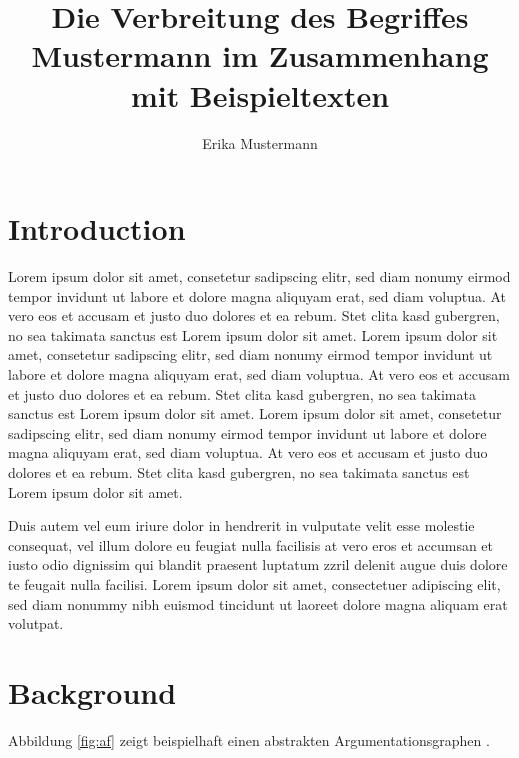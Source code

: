 \documentclass[proposal,palatino,english]{AIGpaper}
\author{Erika Mustermann}
\title{Die Verbreitung des Begriffes \glqq{}Mustermann\grqq{} im Zusammenhang mit Beispieltexten}
\theoremstyle{definition}
\begin{document}
\maketitle %



\section{Introduction}
Lorem ipsum dolor sit amet, consetetur sadipscing elitr, sed diam nonumy eirmod tempor invidunt ut labore et dolore magna aliquyam erat, sed diam voluptua. At vero eos et accusam et justo duo dolores et ea rebum. Stet clita kasd gubergren, no sea takimata sanctus est Lorem ipsum dolor sit amet. Lorem ipsum dolor sit amet, consetetur sadipscing elitr, sed diam nonumy eirmod tempor invidunt ut labore et dolore magna aliquyam erat, sed diam voluptua. At vero eos et accusam et justo duo dolores et ea rebum. Stet clita kasd gubergren, no sea takimata sanctus est Lorem ipsum dolor sit amet. Lorem ipsum dolor sit amet, consetetur sadipscing elitr, sed diam nonumy eirmod tempor invidunt ut labore et dolore magna aliquyam erat, sed diam voluptua. At vero eos et accusam et justo duo dolores et ea rebum. Stet clita kasd gubergren, no sea takimata sanctus est Lorem ipsum dolor sit amet.   

Duis autem vel eum iriure dolor in hendrerit in vulputate velit esse molestie consequat, vel illum dolore eu feugiat nulla facilisis at vero eros et accumsan et iusto odio dignissim qui blandit praesent luptatum zzril delenit augue duis dolore te feugait nulla facilisi. Lorem ipsum dolor sit amet, consectetuer adipiscing elit, sed diam nonummy nibh euismod tincidunt ut laoreet dolore magna aliquam erat volutpat.   


\section{Background}
Abbildung \ref{fig:af} zeigt beispielhaft einen abstrakten Argumentationsgraphen \cite{dung1995acceptability}.
\end{document}
